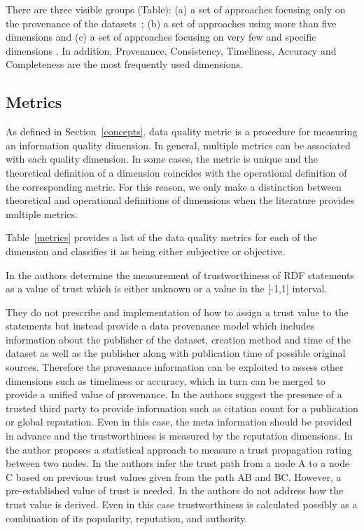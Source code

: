 There are three visible groups (Table): (a) a set of approaches focusing only on the provenance of the datasets~\cite{Hartig2008, Gamble2011, Shekarpour2010, Golbeck2006, Gil2002, Golbeck2003, Gil2007, Jacobi2011, Bonatti2011, Rula2012}; (b) a set of approaches using more than five dimensions \cite{Bizer, Flemming, Hogan:2012, Mendes} and (c) a set of approaches focusing on very few and specific dimensions  \cite{Bohm, Chen, Gueret, Hogan, Lei, Mostafavi}.
In addition, Provenance, Consistency, Timeliness, Accuracy and Completeness are the most frequently used dimensions. 

\subsection{Metrics}
\label{sec:met}
As defined in Section~\ref{concepts}, data quality metric is a procedure for measuring an information quality dimension.
In general, multiple metrics can be associated with each quality dimension.
In some cases, the metric is unique and the theoretical definition of a dimension coincides with the operational definition of the corresponding metric. 
For this reason, we only make a distinction between theoretical and operational definitions of dimensions when the literature provides multiple metrics.

Table~\ref{metrics} provides a list of the data quality metrics for each of the dimension and classifies it as being either subjective or objective.

In \cite{Hartig2008} the authors determine the measurement of trustworthiness of RDF statements as a value of trust which is either unknown or a value in the [-1,1] interval. 

They do not prescribe and implementation of how to assign a trust value to the statements but instead provide a data provenance model which includes information about the publisher of the dataset, creation method and time of the dataset as well as the publisher along with publication time of possible original sources. 
Therefore the provenance information can be exploited to assess other dimensions such as timeliness or accuracy, which in turn can be merged to provide a unified value of provenance.
In \cite{Gamble2011} the authors suggest the presence of a trusted third party to provide information such as citation count for a publication or global reputation. %
Even in this case, the meta information should be provided in advance and the trustworthiness is measured by the reputation dimensions.
In \cite{Shekarpour2010} the author proposes a statistical approach to measure a trust propagation rating between two nodes. 
In \cite{Golbeck2006} the authors infer the trust path from a node A to a node C based on previous trust values given from the path AB and BC. 
However, a pre-established value of trust is needed. 
In \cite{Gil2002} the authors do not address how the trust value is derived. 
Even in this case trustworthiness is calculated possibly as a combination of its popularity, reputation,
and authority. 

